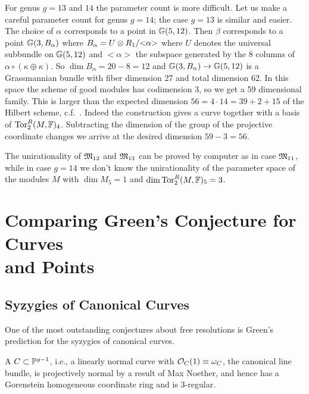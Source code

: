 For genus $g=13$ and $14$ the parameter count is more difficult.
Let us make a careful parameter count for genus $g=14$;
the case $g=13$ is similar and easier.
The choice of $\alpha$ corresponds to a point in ${\mathbb G}(5,12)$.
Then $\beta$ corresponds to a point ${\mathbb G}(3,B_\alpha)$ where 
$B_\alpha = U \otimes R_1/{<}\alpha{>}$ where $U$ denotes
the universal subbundle on ${\mathbb G}(5,12)$ and ${<}\alpha{>}$ 
the subspace generated by the 8 columns of $\alpha\circ(\kappa \oplus \kappa)$. 
So $\dim B_\alpha = 20-8=12$ and ${\mathbb G}(3,B_\alpha) \to {\mathbb G}(5,12)$ 
is a Grassmannian bundle with fiber dimension 27 and total dimension 62. 
In this space the scheme of good modules has codimension 3, 
so we get a 59 dimensional family. 
This is larger than the expected dimension $56=4\cdot 14=39+2+15$ 
of the Hilbert scheme, c.f.~\cite{CO:Ha2}. 
Indeed the construction gives a curve together
with a basis of ${\rm{Tor}}_2^R(M,{\mathbb F})_4$. 
Subtracting the dimension of the group of the projective coordinate changes 
we arrive at the desired dimension $59-3=56$. 

The unirationality of $\mathfrak M_{12}$ and $\mathfrak M_{13}$ can be proved by computer 
as in case $\mathfrak M_{11}$, 
while in case $g=14$ we don't know the unirationality of 
the parameter space of the modules $M$ with 
$\dim M_5=1$ and $\dim {\rm{Tor}}^R_2(M,{\mathbb F})_5=3$.

\section[Comparing Green's Conjecture for Curves and Points]
	{Comparing Green's Conjecture for Curves \\ and Points}

\subsection{Syzygies of Canonical Curves}
One of the most outstanding conjectures about free resolutions is 
Green's prediction
for the syzygies of canonical curves. 

A 
$C \subset {\mathbb P}^{g-1}$, i.e., a linearly normal curve with ${\mathcal O}_C(1) \equiv 
\omega_C$, the canonical line bundle, is projectively normal by a result of
Max Noether, and hence has a Gorenstein homogeneous coordinate ring and is 
3-regular.

